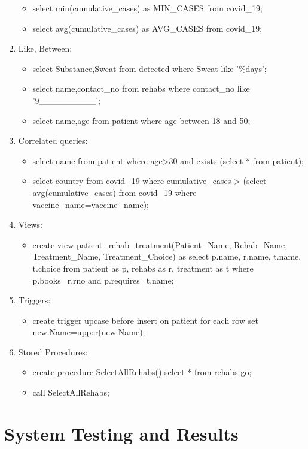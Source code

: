 \documentclass{report}
\begin{document}
\begin{enumerate}
\begin{itemize}
        \item select min(cumulative\_cases) as MIN\_CASES from covid\_19;
        \item select avg(cumulative\_cases) as AVG\_CASES from covid\_19;
    \end{itemize}
\item Like, Between:
    \begin{itemize}
        \item select Substance,Sweat from detected where Sweat like '\%days';
        \item select name,contact\_no from rehabs where contact\_no like '9\_\_\_\_\_\_\_\_\_';
        \item select name,age from patient where age between 18 and 50;
    \end{itemize}
\item Correlated queries:
    \begin{itemize}
        \item select name from patient where age>30 and exists (select * from patient);
        \item select country from covid\_19 where cumulative\_cases > (select avg(cumulative\_cases) from covid\_19 where vaccine\_name=vaccine\_name);  
    \end{itemize}
\item Views:
    \begin{itemize}
        \item create view patient\_rehab\_treatment(Patient\_Name, Rehab\_Name, Treatment\_Name,
                Treatment\_Choice) as select p.name, r.name, t.name, t.choice from patient as p, 
                rehabs as r, treatment as t where p.books=r.rno and p.requires=t.name;
    \end{itemize}
\item Triggers:
    \begin{itemize}
        \item create trigger upcase before insert on patient for each row set new.Name=upper(new.Name);
    \end{itemize}
\item Stored Procedures:
    \begin{itemize}
        \item create procedure SelectAllRehabs() select * from rehabs go;
        \item call SelectAllRehabs;
    \end{itemize}
\end{enumerate}
\chapter{System Testing and Results}
\end{document}
